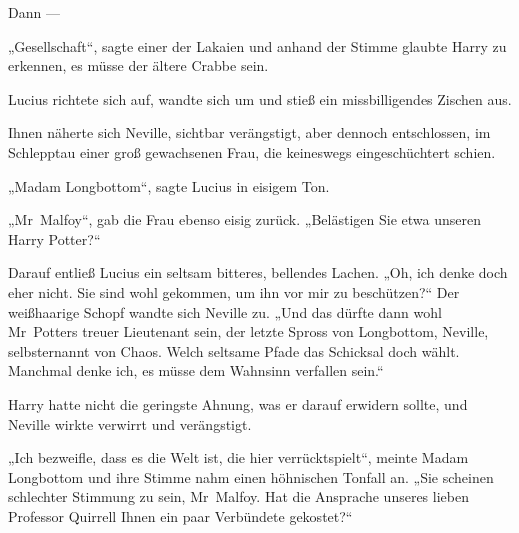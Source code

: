 Dann —

„Gesellschaft“, sagte einer der Lakaien und anhand der Stimme glaubte Harry zu erkennen, es müsse der ältere Crabbe sein.

Lucius richtete sich auf, wandte sich um und stieß ein missbilligendes Zischen aus.

Ihnen näherte sich Neville, sichtbar verängstigt, aber dennoch entschlossen, im Schlepptau einer groß gewachsenen Frau, die keineswegs eingeschüchtert schien.

„Madam Longbottom“, sagte Lucius in eisigem Ton.

„Mr~Malfoy“, gab die Frau ebenso eisig zurück.
„Belästigen Sie etwa unseren Harry Potter?“

Darauf entließ Lucius ein seltsam bitteres, bellendes Lachen.
„Oh, ich denke doch eher nicht. Sie sind wohl gekommen, um ihn vor mir zu beschützen?“ Der weißhaarige Schopf wandte sich Neville zu.
„Und das dürfte dann wohl Mr~Potters treuer Lieutenant sein, der letzte Spross von Longbottom, Neville, selbsternannt von Chaos. Welch seltsame Pfade das Schicksal doch wählt. Manchmal denke ich, es müsse dem Wahnsinn verfallen sein.“

Harry hatte nicht die geringste Ahnung, was er darauf erwidern sollte, und Neville wirkte verwirrt und verängstigt.

„Ich bezweifle, dass es die Welt ist, die hier verrücktspielt“, meinte Madam Longbottom und ihre Stimme nahm einen höhnischen Tonfall an.
„Sie scheinen schlechter Stimmung zu sein, Mr~Malfoy. Hat die Ansprache unseres lieben Professor Quirrell Ihnen ein paar Verbündete gekostet?“

